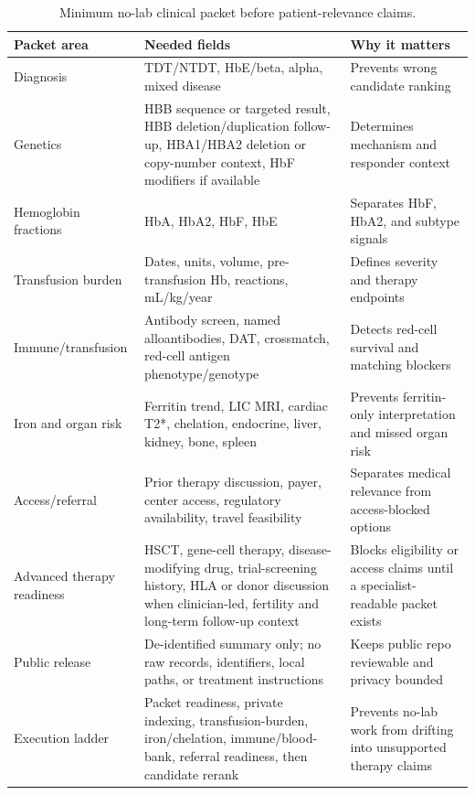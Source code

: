 \begin{table}[htbp]
\centering
\small
\caption{Minimum no-lab clinical packet before patient-relevance claims.}
\label{tab:no-lab-packet}
\begin{tabularx}{\textwidth}{@{}p{}Y Y@{}}
\toprule
Packet area & Needed fields & Why it matters \\
\midrule
Diagnosis & TDT/NTDT, HbE/beta, alpha, mixed disease & Prevents wrong
candidate ranking \\
Genetics & HBB sequence or targeted result, HBB deletion/duplication follow-up,
HBA1/HBA2 deletion or copy-number context, HbF modifiers if available &
Determines mechanism and responder context \\
Hemoglobin fractions & HbA, HbA2, HbF, HbE & Separates HbF, HbA2, and subtype
signals \\
Transfusion burden & Dates, units, volume, pre-transfusion Hb, reactions,
mL/kg/year & Defines severity and therapy endpoints \\
Immune/transfusion & Antibody screen, named alloantibodies, DAT, crossmatch,
red-cell antigen phenotype/genotype & Detects red-cell survival and matching
blockers \\
Iron and organ risk & Ferritin trend, LIC MRI, cardiac T2*, chelation,
endocrine, liver, kidney, bone, spleen & Prevents ferritin-only interpretation
and missed organ risk \\
Access/referral & Prior therapy discussion, payer, center access, regulatory
availability, travel feasibility & Separates medical relevance from
access-blocked options \\
Advanced therapy readiness & HSCT, gene-cell therapy, disease-modifying drug,
trial-screening history, HLA or donor discussion when clinician-led, fertility
and long-term follow-up context & Blocks eligibility or access claims until a
specialist-readable packet exists \\
Public release & De-identified summary only; no raw records, identifiers, local
paths, or treatment instructions & Keeps public repo reviewable and privacy
bounded \\
Execution ladder & Packet readiness, private indexing, transfusion-burden,
iron/chelation, immune/blood-bank, referral readiness, then candidate rerank &
Prevents no-lab work from drifting into unsupported therapy claims \\
\bottomrule
\end{tabularx}
\end{table}
